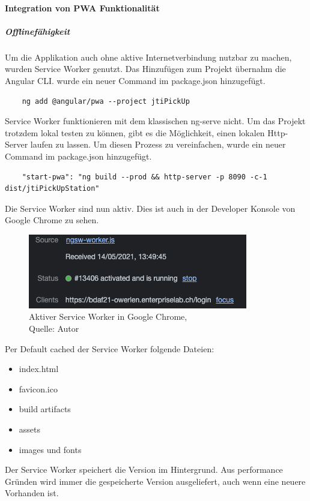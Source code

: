 \paragraph{Integration von \ac{PWA} Funktionalität}
\subparagraph{Offlinefähigkeit}
Um die Applikation auch ohne aktive Internetverbindung nutzbar zu machen, wurden Service Worker genutzt. Das Hinzufügen zum Projekt übernahm die Angular CLI. 
wurde ein neuer Command im package.json hinzugefügt. 
\begin{verbatim}
	ng add @angular/pwa --project jtiPickUp
\end{verbatim}
Service Worker funktionieren mit dem klassischen ng-serve nicht. Um das Projekt trotzdem lokal testen zu können, gibt es die Möglichkeit, einen lokalen Http-Server laufen zu lassen. Um diesen Prozess zu vereinfachen, wurde ein neuer Command im package.json hinzugefügt. 
\begin{verbatim}
	"start-pwa": "ng build --prod && http-server -p 8090 -c-1 dist/jtiPickUpStation"
\end{verbatim}
Die Service Worker sind nun aktiv. Dies ist auch in der Developer Konsole von Google Chrome zu sehen. 
 \begin{figure}[H]
	\centering
	\includegraphics[scale=0.6]{images/serviceWorker.PNG}
	\caption[Aktiver Service Worker in Google Chrome]{Aktiver Service Worker in Google Chrome,\\ Quelle: Autor}
	\label{img: serviceWorker}
\end{figure} 

Per Default cached der Service Worker folgende Dateien: 
\begin{itemize}
	\item index.html
	\item favicon.ico
	\item build artifacts
	\item assets 
	\item images und fonts
\end{itemize} \cite{serviceWorker}
Der Service Worker speichert die Version im Hintergrund. Aus performance Gründen wird immer die gespeicherte Version ausgeliefert, auch wenn eine neuere Vorhanden ist. \\
